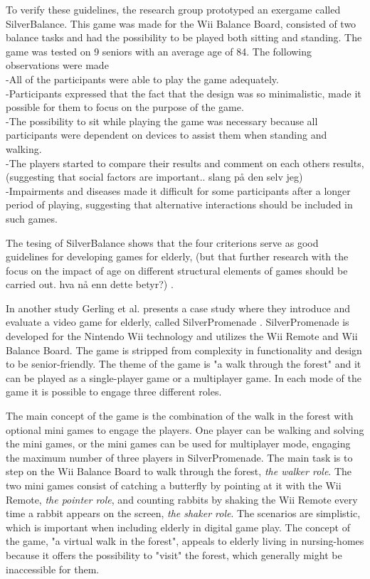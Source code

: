 To verify these guidelines, the research group prototyped an exergame called SilverBalance. This game was made for the Wii Balance Board, consisted of two balance tasks and had the possibility to be played both sitting and standing. The game was tested on 9 seniors with an average age of 84. The following observations were made \cite{gerling1} \\
-All of the participants were able to play the game adequately. \\
-Participants expressed that the fact that the design was so minimalistic, made it possible for them to focus on the purpose of the game. \\
-The possibility to sit while playing the game was necessary because all participants were dependent on devices to assist them when standing and walking.\\
-The players started to compare their results and comment on each others results, (suggesting that social factors are important.. slang på den selv jeg)\\
-Impairments and diseases made it difficult for some participants after a longer period of playing, suggesting that alternative interactions should be included in such games.

The tesing of SilverBalance shows that the four criterions serve as good guidelines for developing games for elderly, (but that further research with the focus on the impact of age on different structural elements of games should be carried out. hva nå enn dette betyr?) \cite{gerling1}.

In another study Gerling et al. presents a case study where they introduce and evaluate a video game for elderly, called SilverPromenade \cite{gerling2}.  SilverPromenade is developed for the Nintendo Wii technology and utilizes the Wii Remote and Wii Balance Board. The game is stripped from complexity in functionality and design to be senior-friendly. The theme of the game is "a walk through the forest" and it can be played as a single-player game or a multiplayer game. In each mode of the game it is possible to engage three different roles.

The main concept of the game is the combination of the walk in the forest with optional mini games to engage the players. One player can be walking and solving the mini games, or the mini games can be used for multiplayer mode, engaging the maximum number of three players in SilverPromenade. The main task is to step on the Wii Balance Board to walk through the forest, \emph{the walker role}. The two mini games consist of catching a butterfly by pointing at it with the Wii Remote, \emph{the pointer role}, and counting rabbits by shaking the Wii Remote every time a rabbit appears on the screen, \emph{the shaker role}. The scenarios are simplistic, which is important when including elderly in digital game play. The concept of the game, "a virtual walk in the forest", appeals to elderly living in nursing-homes because it offers the possibility to "visit" the forest, which generally might be inaccessible for them.

